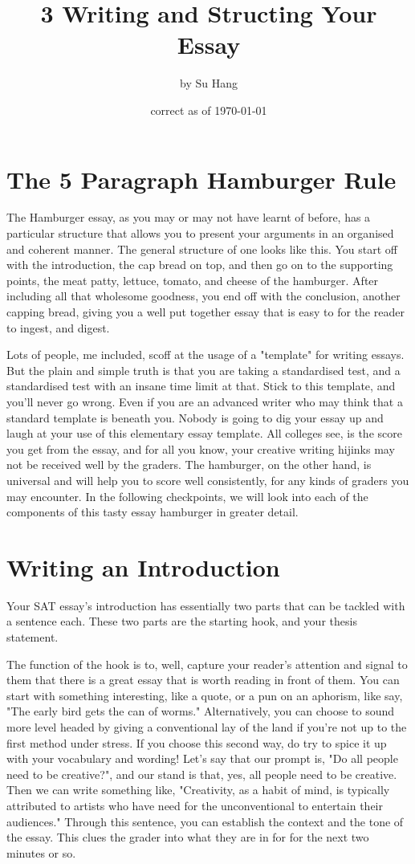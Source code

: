 \documentclass[DIV=calc,11pt,parskip,numbers=noenddot]{scrartcl} %
\title{3 Writing and Structing Your Essay}
\author{\large by Su Hang}
\date{\small correct as of \today}
\begin{document}
\maketitle
\section{The 5 Paragraph Hamburger Rule}
The Hamburger essay, as you may or may not have learnt of before, has a particular structure that allows you to present your arguments in an organised and coherent manner. The general structure of one looks like this. You start off with the introduction, the cap bread on top, and then go on to the supporting points, the meat patty, lettuce, tomato, and cheese of the hamburger. After including all that wholesome goodness, you end off with the conclusion, another capping bread, giving you a well put together essay that is easy to for the reader to ingest, and digest.

Lots of people, me included, scoff at the usage of a "template" for writing essays. But the plain and simple truth is that you are taking a standardised test, and a standardised test with an insane time limit at that. Stick to this template, and you’ll never go wrong. Even if you are an advanced writer who may think that a standard template is beneath you. Nobody is going to dig your essay up and laugh at your use of this elementary essay template. All colleges see, is the score you get from the essay, and for all you know, your creative writing hijinks may not be received well by the graders. The hamburger, on the other hand, is universal and will help you to score well consistently, for any kinds of graders you may encounter. In the following checkpoints, we will look into each of the components of this tasty essay hamburger in greater detail.
\section{Writing an Introduction}
Your SAT essay’s introduction has essentially two parts that can be tackled with a sentence each. These two parts are the starting hook, and your thesis statement.

The function of the hook is to, well, capture your reader’s attention and signal to them that there is a great essay that is worth reading in front of them. You can start with something interesting, like a quote, or a pun on an aphorism, like say, "The early bird gets the can of worms." Alternatively, you can choose to sound more level headed by giving a conventional lay of the land if you’re not up to the first method under stress. If you choose this second way, do try to spice it up with your vocabulary and wording! Let’s say that our prompt is, "Do all people need to be creative?", and our stand is that, yes, all people need to be creative. Then we can write something like, "Creativity, as a habit of mind, is typically attributed to artists who have need for the unconventional to entertain their audiences." Through this sentence, you can establish the context and the tone of the essay. This clues the grader into what they are in for for the next two minutes or so.
\end{document}
